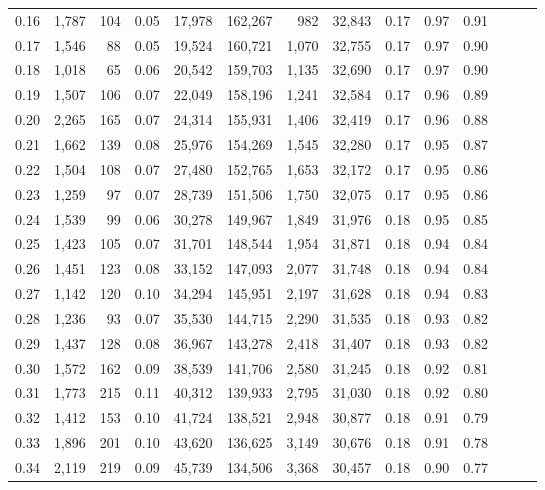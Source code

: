 \begin{tabular}{rrrrrrrrrrrrrr}
0.16 &  1,787 &  104 &  0.05 &   17,978 &  162,267 &     982 &  32,843 &  0.17 &  0.97 &      0.91 \\
0.17 &  1,546 &   88 &  0.05 &   19,524 &  160,721 &   1,070 &  32,755 &  0.17 &  0.97 &      0.90 \\
0.18 &  1,018 &   65 &  0.06 &   20,542 &  159,703 &   1,135 &  32,690 &  0.17 &  0.97 &      0.90 \\
0.19 &  1,507 &  106 &  0.07 &   22,049 &  158,196 &   1,241 &  32,584 &  0.17 &  0.96 &      0.89 \\
0.20 &  2,265 &  165 &  0.07 &   24,314 &  155,931 &   1,406 &  32,419 &  0.17 &  0.96 &      0.88 \\
0.21 &  1,662 &  139 &  0.08 &   25,976 &  154,269 &   1,545 &  32,280 &  0.17 &  0.95 &      0.87 \\
0.22 &  1,504 &  108 &  0.07 &   27,480 &  152,765 &   1,653 &  32,172 &  0.17 &  0.95 &      0.86 \\
0.23 &  1,259 &   97 &  0.07 &   28,739 &  151,506 &   1,750 &  32,075 &  0.17 &  0.95 &      0.86 \\
0.24 &  1,539 &   99 &  0.06 &   30,278 &  149,967 &   1,849 &  31,976 &  0.18 &  0.95 &      0.85 \\
0.25 &  1,423 &  105 &  0.07 &   31,701 &  148,544 &   1,954 &  31,871 &  0.18 &  0.94 &      0.84 \\
0.26 &  1,451 &  123 &  0.08 &   33,152 &  147,093 &   2,077 &  31,748 &  0.18 &  0.94 &      0.84 \\
0.27 &  1,142 &  120 &  0.10 &   34,294 &  145,951 &   2,197 &  31,628 &  0.18 &  0.94 &      0.83 \\
0.28 &  1,236 &   93 &  0.07 &   35,530 &  144,715 &   2,290 &  31,535 &  0.18 &  0.93 &      0.82 \\
0.29 &  1,437 &  128 &  0.08 &   36,967 &  143,278 &   2,418 &  31,407 &  0.18 &  0.93 &      0.82 \\
0.30 &  1,572 &  162 &  0.09 &   38,539 &  141,706 &   2,580 &  31,245 &  0.18 &  0.92 &      0.81 \\
0.31 &  1,773 &  215 &  0.11 &   40,312 &  139,933 &   2,795 &  31,030 &  0.18 &  0.92 &      0.80 \\
0.32 &  1,412 &  153 &  0.10 &   41,724 &  138,521 &   2,948 &  30,877 &  0.18 &  0.91 &      0.79 \\
0.33 &  1,896 &  201 &  0.10 &   43,620 &  136,625 &   3,149 &  30,676 &  0.18 &  0.91 &      0.78 \\
0.34 &  2,119 &  219 &  0.09 &   45,739 &  134,506 &   3,368 &  30,457 &  0.18 &  0.90 &      0.77 \\

\end{tabular}
